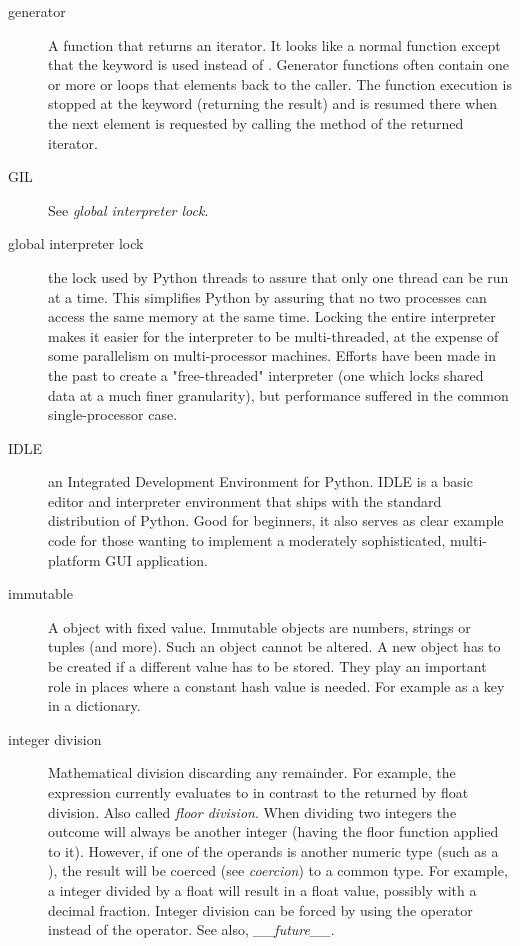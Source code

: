 \begin{description}
\item[generator]{A function that returns an iterator.  It looks like a
normal function except that the  keyword is used instead of
{}.  Generator functions often contain one or more
{} or  loops that  elements back to
the caller.  The function execution is stopped at the  keyword
(returning the result) and is resumed there when the next element is
requested by calling the  method of the returned iterator.}

\item[GIL]{See \emph{global interpreter lock}.}

\item[global interpreter lock]{the lock used by Python threads to assure
that only one thread can be run at a time.  This simplifies Python by
assuring that no two processes can access the same memory at the same time.
Locking the entire interpreter makes it easier for the interpreter to be
multi-threaded, at the expense of some parallelism on multi-processor
machines.  Efforts have been made in the past to create a "free-threaded"
interpreter (one which locks shared data at a much finer granularity), but
performance suffered in the common single-processor case.}

\item[IDLE]{an Integrated Development Environment for Python.  IDLE is a
basic editor and interpreter environment that ships with the standard
distribution of Python.  Good for beginners, it also serves as clear
example code for those wanting to implement a moderately
sophisticated, multi-platform GUI application.}

\item[immutable]{A object with fixed value.  Immutable objects are numbers,
strings or tuples (and more).  Such an object cannot be altered.  A new object
has to be created if a different value has to be stored.  They play an
important role in places where a constant hash value is needed.  For example
as a key in a dictionary.}

\item[integer division]{Mathematical division discarding any remainder.  For
example, the expression  currently evaluates to  in
contrast to the  returned by float division.  Also called
\emph{floor division}.  When dividing two integers the outcome will always be
another integer (having the floor function applied to it).  However, if one
of the operands is another numeric type (such as a ), the result
will be coerced (see \emph{coercion}) to a common type.  For example, a integer
divided by a float will result in a float value, possibly with a decimal
fraction.  Integer division can be forced by using the \code{//} operator
instead of the \code{/} operator.
See also, \emph{__future__}.}


\end{description}
